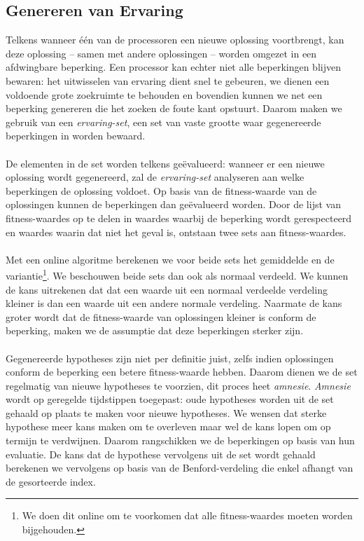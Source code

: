 \subsection{Genereren van Ervaring}
 
Telkens wanneer \'e\'en van de processoren een nieuwe oplossing voortbrengt, kan deze oplossing -- samen met andere oplossingen -- worden omgezet in een afdwingbare beperking. Een processor kan echter niet alle beperkingen blijven bewaren: het uitwisselen van ervaring dient snel te gebeuren, we dienen een voldoende grote zoekruimte te behouden en bovendien kunnen we net een beperking genereren die het zoeken de foute kant opstuurt. Daarom maken we gebruik van een \emph{ervaring-set}, een set van vaste grootte waar gegenereerde beperkingen in worden bewaard.

\paragraph{}
De elementen in de set worden telkens ge\"evalueerd: wanneer er een nieuwe oplossing wordt gegenereerd, zal de \emph{ervaring-set} analyseren aan welke beperkingen de oplossing voldoet. Op basis van de fitness-waarde van de oplossingen kunnen de beperkingen dan ge\"evalueerd worden. Door de lijst van fitness-waardes op te delen in waardes waarbij de beperking wordt gerespecteerd en waardes waarin dat niet het geval is, ontstaan twee sets aan fitness-waardes.

\paragraph{}
Met een online algoritme\cite[p. 232]{citeulike:175026} berekenen we voor beide sets het gemiddelde en de variantie\footnote{We doen dit online om te voorkomen dat alle fitness-waardes moeten worden bijgehouden.}. We beschouwen beide sets dan ook als normaal verdeeld. We kunnen de kans uitrekenen dat dat een waarde uit een normaal verdeelde verdeling kleiner is dan een waarde uit een andere normale verdeling. Naarmate de kans groter wordt dat de fitness-waarde van oplossingen kleiner is conform de beperking, maken we de assumptie dat deze beperkingen sterker zijn.

\paragraph{}
Gegenereerde hypotheses zijn niet per definitie juist, zelfs indien oplossingen conform de beperking een betere fitness-waarde hebben. Daarom dienen we de set regelmatig van nieuwe hypotheses te voorzien, dit proces heet \emph{amnesie}. \emph{Amnesie} wordt op geregelde tijdstippen toegepast: oude hypotheses worden uit de set gehaald op plaats te maken voor nieuwe hypotheses. We wensen dat sterke hypothese meer kans maken om te overleven maar wel de kans lopen om op termijn te verdwijnen. Daarom rangschikken we de beperkingen op basis van hun evaluatie. De kans dat de hypothese vervolgens uit de set wordt gehaald berekenen we vervolgens op basis van de Benford-verdeling\cite{citeulike:748130} die enkel afhangt van de gesorteerde index.

